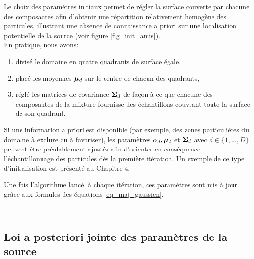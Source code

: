 {  Le choix des paramètres initiaux permet de régler la surface couverte par chacune des composantes afin d'obtenir une répartition relativement homogène des particules, illustrant une absence de connaissance a priori sur une localisation potentielle de la source (voir figure \ref{fig_init_amis}). \\
  
  
  En pratique, nous avons:
  
  \begin{enumerate}
  	\item divisé le domaine en quatre quadrants de surface égale, 
  	\item  placé les moyennes ${\bm{\mu}}_d$ sur le centre de chacun des quadrants,
  	\item réglé les matrices de covariance ${\bm{\Sigma}}_d$ de façon à ce que chacune des composantes de la mixture fournisse des échantillons couvrant toute la surface de son quadrant.\\
  \end{enumerate}
  
 {Si une information a priori est disponible (par exemple, des zones particulières du domaine à exclure ou à favoriser), les paramètres $\alpha_d, {\bm{\mu}}_d$ et ${\bm{\Sigma}}_d$ avec $d \in \{1,\dots,D\}$ peuvent être préalablement ajustés afin d'orienter en conséquence l'échantillonnage des particules dès la première itération. Un exemple de ce type d'initialisation est présenté au Chapitre 4.
 	
 	Une fois l'algorithme lancé, à chaque itération, ces paramètres  sont mis à jour grâce aux formules des équations \eqref{eq_maj_gaussien}.}\\

\subsection{Loi a posteriori jointe des paramètres de la source}



}
